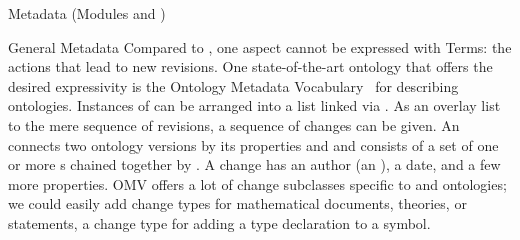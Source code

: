 \begin{tchapter}[id=metadata,short=Metadata]{Metadata (Modules {} and  {})}
\begin{tsection}{General Metadata}
Compared to , one aspect cannot be expressed with \dcmi
Terms: the actions that lead to new revisions.  One state-of-the-art
ontology that offers the desired expressivity is the Ontology Metadata
Vocabulary~\cite{OMV:on,PHCG:ChangeReprOWL2Onto09} for describing
ontologies. Instances of  can be
arranged into a list linked via .  As
an overlay list to the mere sequence of revisions, a sequence of
changes can be given.  An 
connects two ontology versions by its properties
 and
 and consists of a set of one or more
s chained together by
.  A change has an author (an
), a date, and a few more properties.  OMV
offers a lot of change subclasses specific to \rdfs and \owl
ontologies; we could easily add change types for mathematical
documents, theories, or statements, \eg a change type for adding a
type declaration to a symbol.



\end{tsection}
\end{tchapter}
